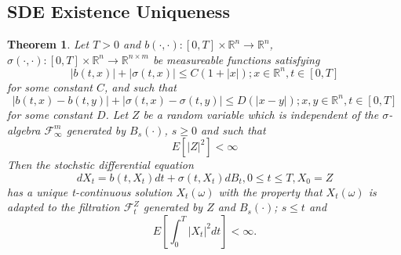 \documentclass[12pt]{article}
\newtheorem{theorem}{Theorem}[section]
\theoremstyle{definition}
\numberwithin{equation}{section}
\begin{document}
\subsection{SDE Existence Uniqueness}
\label{subsec:SDEExistenceUniqueness}
\begin{theorem}
  Let $T > 0$ and $b(\cdot,\cdot):[0,T] \times \mathbb{R}^n \rightarrow \mathbb{R}^n$, $\sigma(\cdot,\cdot):[0,T] \times \mathbb{R}^n \rightarrow \mathbb{R}^{n \times m}$ be measureable functions satisfying 
  \begin{equation}
    |b(t,x)| + |\sigma(t,x)| \leq C(1+|x|); x \in \mathbb{R}^n, t \in [0,T]
  \end{equation}
  for some constant $C$, and such that 
  \begin{equation}
    |b(t,x) - b(t,y)| + |\sigma(t,x) - \sigma(t,y)| \leq D(|x-y|); x,y \in \mathbb{R}^n, t \in [0,T]
  \end{equation}
  for some constant $D$. Let $Z$ be a random variable which is independent of the $\sigma$-algebra $\mathcal{F}_{\infty}^{m}$ generated by $B_s(\cdot)$, $s\geq 0$ and such that 
  \begin{equation}
    E[|Z|^2] < \infty
  \end{equation}
Then the stochstic differential equation 
\begin{equation}
  dX_t = b(t,X_t)dt + \sigma(t, X_t)dB_t, 0 \leq t \leq T, X_0 = Z
\end{equation}
has a unique t-continuous solution $X_t(\omega)$ with the property that $X_t(\omega)$ is adapted to the filtration $\mathcal{F}_t^Z$ generated by $Z$ and $B_s(\cdot)$; $s \leq t$
and 
\begin{equation}
  E[\int_0^T|X_t|^2dt] < \infty.
\end{equation}

\end{theorem}
\end{document}
